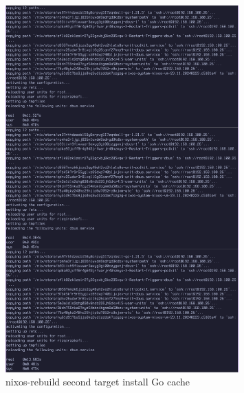 \documentclass[10pt,twoside]{report}
\begin{document}
\begin{adjustwidth}{20pt}{}
	\begin{figure}[H]
		\begin{center}
			\includegraphics[width=0.8\textwidth]{images/nix-target/nix-go-cache-26-com.png}
		\end{center}
		\caption{nixos-rebuild second target install Go cache}
	\end{figure}


\end{adjustwidth}
\end{document}
